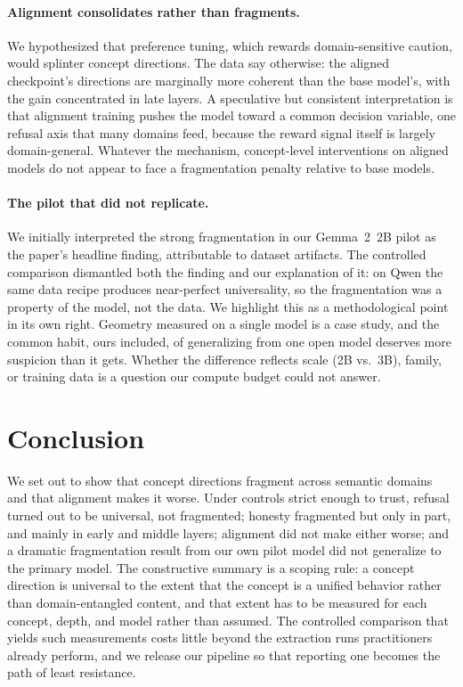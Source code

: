 \documentclass[11pt]{article}
\begin{document}
\paragraph{Alignment consolidates rather than fragments.}
We hypothesized that preference tuning, which rewards domain-sensitive
caution, would splinter concept directions. The data say otherwise: the
aligned checkpoint's directions are marginally more coherent than the base
model's, with the gain concentrated in late layers. A speculative but
consistent interpretation is that alignment training pushes the model
toward a common decision variable, one refusal axis that many domains feed,
because the reward signal itself is largely domain-general. Whatever the
mechanism, concept-level interventions on aligned models do not appear to
face a fragmentation penalty relative to base models.

\paragraph{The pilot that did not replicate.}
We initially interpreted the strong fragmentation in our Gemma~2~2B pilot as
the paper's headline finding, attributable to dataset artifacts. The
controlled comparison dismantled both the finding and our explanation of it:
on Qwen the same data recipe produces near-perfect universality, so the
fragmentation was a property of the model, not the data. We highlight this
as a methodological point in its own right. Geometry measured on a single
model is a case study, and the common habit, ours included, of generalizing
from one open model deserves more suspicion than it gets.
Whether the difference reflects scale (2B vs.\ 3B), family, or training data
is a question our compute budget could not answer.


\section{Conclusion}
\label{sec:conclusion}

We set out to show that concept directions fragment across semantic domains
and that alignment makes it worse. Under controls strict enough to trust,
refusal turned out to be universal, not fragmented; honesty fragmented but
only in part, and mainly in early and middle layers; alignment did not make
either worse; and a dramatic fragmentation result from our own pilot model
did not generalize to the primary model. The constructive summary is a scoping rule: a concept direction is universal
to the extent that the concept is a unified behavior rather than
domain-entangled content, and that extent has to be measured for each
concept, depth, and model rather than assumed. The controlled comparison
that yields such measurements costs little beyond the extraction runs
practitioners already perform, and we release our pipeline so that reporting
one becomes the path of least resistance.
\end{document}
